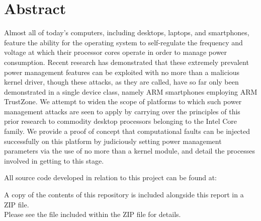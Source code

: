 \chapter*{Abstract}

Almost all of today's computers, including desktops, laptops, and
smartphones, feature the ability for the operating system to self-regulate
the frequency and voltage at which their processor cores operate in order
to manage power consumption. Recent research has demonstrated that these
extremely prevalent power management features can be exploited with no more
than a malicious kernel driver, though these \clkscrew{} attacks, as they
are called, have so far only been demonstrated in a single device class,
namely ARM smartphones employing ARM TrustZone. We attempt to widen the
scope of platforms to which such power management attacks are seen to apply
by carrying over the principles of this prior research to commodity desktop
processors belonging to the Intel Core family. We provide a proof of
concept that computational faults can be injected successfully on this
platform by judiciously setting power management parameters via the use of
no more than a kernel module, and detail the processes involved in getting
to this stage.

\vspace*{2em}

\begin{center}
    All source code developed in relation to this project can be found at:\\
    \href{https://git-teaching.cs.bham.ac.uk/mod-ug-proj-2018/nxp569}{}
    
    \vspace*{1em}
    A copy of the contents of this repository is included alongside this report in a ZIP file.\\
    Please see the  file included within the ZIP file for details.
\end{center}
